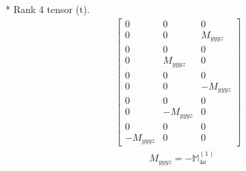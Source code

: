 \documentclass[fleqn,8pt,landscape]{jsarticle}
\begin{document}
* Rank 4 tensor (t).
\begin{align*}
\begin{bmatrix} 0 & 0 & 0 \\ 0 & 0 & M_{yyyz} \\ 0 & 0 & 0 \\ 0 & M_{yyyz} & 0 \\ 0 & 0 & 0 \\ 0 & 0 & - M_{yyyz} \\ 0 & 0 & 0 \\ 0 & - M_{yyyz} & 0 \\ 0 & 0 & 0 \\ - M_{yyyz} & 0 & 0 \end{bmatrix}
\end{align*}
\begin{align*}
& M_{yyyz} = - \mathbb{M}_{4a}^{(1)}
\end{align*}
\end{document}
